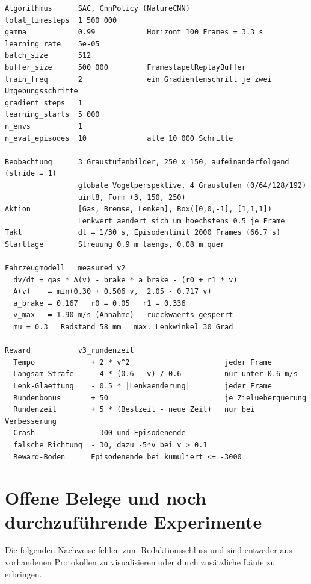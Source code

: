 \begin{lstlisting}[caption={Konfiguration des aktuellsten großen SAC-Laufs, gekürzt aus \texttt{train\_config.json}.},label={lst:hyperparameter}]
Algorithmus      SAC, CnnPolicy (NatureCNN)
total_timesteps  1 500 000
gamma            0.99            Horizont 100 Frames = 3.3 s
learning_rate    5e-05
batch_size       512
buffer_size      500 000         FramestapelReplayBuffer
train_freq       2               ein Gradientenschritt je zwei Umgebungsschritte
gradient_steps   1
learning_starts  5 000
n_envs           1
n_eval_episodes  10              alle 10 000 Schritte

Beobachtung      3 Graustufenbilder, 250 x 150, aufeinanderfolgend (stride = 1)
                 globale Vogelperspektive, 4 Graustufen (0/64/128/192)
                 uint8, Form (3, 150, 250)
Aktion           [Gas, Bremse, Lenken], Box([0,0,-1], [1,1,1])
                 Lenkwert aendert sich um hoechstens 0.5 je Frame
Takt             dt = 1/30 s, Episodenlimit 2000 Frames (66.7 s)
Startlage        Streuung 0.9 m laengs, 0.08 m quer

Fahrzeugmodell   measured_v2
  dv/dt = gas * A(v) - brake * a_brake - (r0 + r1 * v)
  A(v)    = min(0.30 + 0.506 v,  2.05 - 0.717 v)
  a_brake = 0.167   r0 = 0.05   r1 = 0.336
  v_max   = 1.90 m/s (Annahme)   rueckwaerts gesperrt
  mu = 0.3   Radstand 58 mm   max. Lenkwinkel 30 Grad

Reward           v3_rundenzeit
  Tempo             + 2 * v^2                      jeder Frame
  Langsam-Strafe    - 4 * (0.6 - v) / 0.6          nur unter 0.6 m/s
  Lenk-Glaettung    - 0.5 * |Lenkaenderung|        jeder Frame
  Rundenbonus       + 50                           je Zielueberquerung
  Rundenzeit        + 5 * (Bestzeit - neue Zeit)   nur bei Verbesserung
  Crash             - 300 und Episodenende
  falsche Richtung  - 30, dazu -5*v bei v > 0.1
  Reward-Boden      Episodenende bei kumuliert <= -3000
\end{lstlisting}

\section{Offene Belege und noch durchzuführende Experimente}

Die folgenden Nachweise fehlen zum Redaktionsschluss und sind entweder aus vorhandenen Protokollen zu visualisieren oder durch zusätzliche Läufe zu erbringen.

